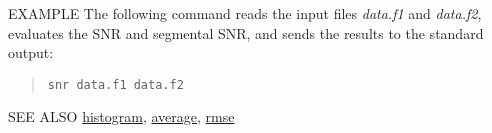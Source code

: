 \begin{qsection}{EXAMPLE}
The following command reads the input files {\em data.f1}
and {\em data.f2}, evaluates the SNR and
segmental SNR, and sends the results to the standard output:
\begin{quote}
 \verb!snr data.f1 data.f2!
\end{quote} 
\end{qsection}

\begin{qsection}{SEE ALSO}
\hyperlink{histogram}{histogram},
\hyperlink{average}{average},
\hyperlink{rmse}{rmse}
\end{qsection}
